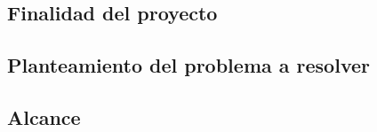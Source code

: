\documentclass[../../main.tex]{subfiles}
\begin{document}
\subsection{Finalidad del proyecto}\label{subsec:finalidad}


\subsection{Planteamiento del problema a resolver}\label{subsec:planteamiento}


\subsection{Alcance}\label{subsec:alcance}

\end{document}
